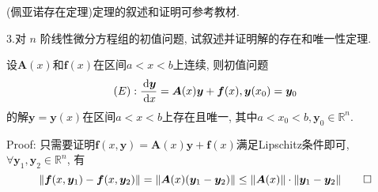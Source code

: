 (佩亚诺存在定理)定理的叙述和证明可参考教材.

3.对 $n$ 阶线性微分方程组的初值问题, 试叙述并证明解的存在和唯一性定理.

\begin{solve} 设$\bm{A}(x)$和$\bm{f}(x)$在区间$a<x<b$上连续, 则初值问题
\[(E):\frac{\,\mathrm{d}\bm{y}}{\,\mathrm{d} x}=\bm{A}(x)\bm{y}+\bm{f}(x),\bm{y}(x_0)=\bm{y}_0\]
的解$\bm{y}=\bm{y}(x)$在区间$a<x<b$上存在且唯一, 其中$a<x_0<b,\bm{y}_0\in\mathbb{R}^n$.

Proof: 只需要证明$\bm{f}(x,\bm{y})=\bm{A}(x)\bm{y}+\bm{f}(x)$满足Lipschitz条件即可, $\forall\bm{y}_1,\bm{y}_2\in\mathbb{R}^n$, 有
\[\|\bm{f}(x,\bm{y}_1)-\bm{f}(x,\bm{y}_2)\|=\|\bm{A}(x)(\bm{y}_1-\bm{y}_2)\|\leq\|\bm{A}(x)\|\cdot\|\bm{y}_1-\bm{y}_2\|\qedhere\]
\end{solve}